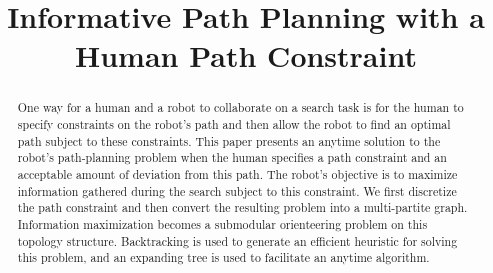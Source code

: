 \documentclass[conference]{IEEEtran}
\begin{document}
\title{Informative Path Planning with a Human Path Constraint}

\author{
}

\maketitle

\begin{abstract}
One way for a human and a robot to collaborate on a search task is for the human to specify constraints on the robot's path and then allow the robot to find an optimal path subject to these constraints.
This paper presents an anytime solution to the robot's path-planning problem when the human specifies a path constraint and an acceptable amount of deviation from this path.
The robot's objective is to maximize information gathered during the search subject to this constraint.
We first discretize the path constraint and then convert the resulting problem into a multi-partite graph.
Information maximization becomes a submodular orienteering problem on this topology structure.
Backtracking is used to generate an efficient heuristic for solving this problem, and an expanding tree is used to facilitate an anytime algorithm.
\end{abstract}

\IEEEpeerreviewmaketitle















\end{document}
